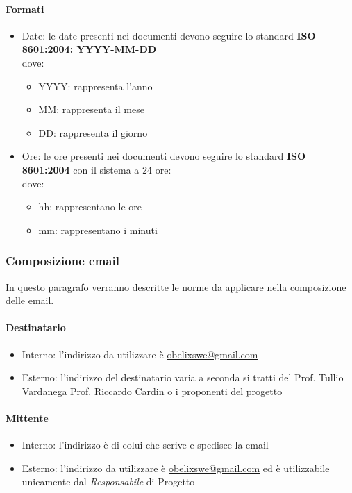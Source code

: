 \paragraph{ Formati }
\begin{itemize}
\item Date: le date presenti nei documenti devono seguire lo standard 
\textbf{ISO 8601:2004:  YYYY-MM-DD}\\
  dove:
  \begin{itemize}
  \item YYYY: rappresenta l'anno
  \item MM: rappresenta il mese
  \item DD: rappresenta il giorno
  \end{itemize}

\item Ore: le ore presenti nei documenti devono seguire lo standard 
\textbf{ISO 8601:2004} con il sistema a 24 ore:\\
  dove:
  \begin{itemize}
  \item hh: rappresentano le ore
  \item  mm: rappresentano i minuti
  \end{itemize}
\end{itemize}

\subsubsection{Composizione email}
In questo paragrafo verranno descritte le norme da applicare nella composizione delle email.

\paragraph{Destinatario}
\begin{itemize} 
\item Interno: l'indirizzo da utilizzare è \href{mailto:obelixswe@gmail.com}{obelixswe@gmail.com}
\item Esterno: l'indirizzo del destinatario varia a seconda si tratti del Prof. Tullio Vardanega
  Prof. Riccardo Cardin o i proponenti del progetto
\end{itemize}
\paragraph{Mittente}
\begin{itemize}
\item Interno: l'indirizzo è di colui che scrive e spedisce la email
\item Esterno: l'indirizzo da utilizzare è \href{mailto:obelixswe@gmail.com}{obelixswe@gmail.com} ed è utilizzabile unicamente dal  \emph{Responsabile}  di Progetto
\end{itemize}
